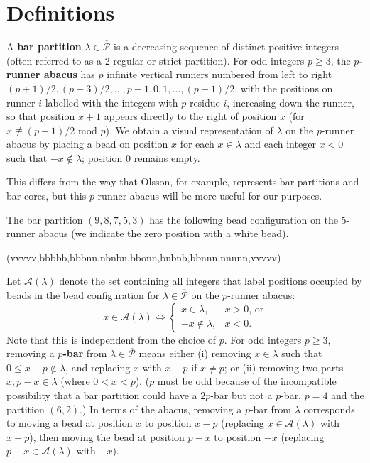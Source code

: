 \documentclass[ALCO, Unicode,published]{cedram}
\newcommand*\nicefrac[2]{#1/#2}
\begin{document}
\section{Definitions}
 
A \textbf{bar partition} $\lambda\in\overline{\mathcal{P}}$ is a decreasing sequence of distinct positive integers (often referred to as a 2-regular or strict partition). For odd integers $p\geq3$, the $p$\textbf{-runner abacus} \cite{F2} has $p$ infinite vertical runners numbered from left to right $\nicefrac{(p+1)}{2},\nicefrac{(p+3)}{2},\dots,p-1,0,1,\dots,\nicefrac{(p-1)}{2}$, with the positions on runner $i$ labelled with the integers with $p$ residue $i$, increasing down the runner, so that position $x+1$ appears directly to the right of position $x$ (for $x\not\equiv\nicefrac{(p-1)}{2}$ mod $p$). We obtain a visual representation of $\lambda$ on the $p$-runner abacus by placing a bead on position $x$ for each $x\in\lambda$ and each integer $x<0$ such that $-x\not\in\lambda$; position 0 remains empty. 

This differs from the way that Olsson, for example, represents bar partitions and bar-cores, but this $p$-runner abacus will be more useful for our purposes. 

\begin{exam}\label{ex1}
The bar partition $(9,8,7,5,3)$ has the following bead configuration on the 5-runner abacus (we indicate the zero position with a white bead).
\begin{center}\abacus(vvvvv,bbbbb,bbbnn,nbnbn,bbonn,bnbnb,bbnnn,nnnnn,vvvvv)\end{center}
\end{exam}

Let $\mathcal{A}(\lambda)$ denote the set containing all integers that label positions occupied by beads in the bead configuration for $\lambda\in\overline{\mathcal{P}}$ on the $p$-runner abacus: 
$$x\in\mathcal{A}(\lambda)\Leftrightarrow\begin{cases}x\in\lambda,&x>0\text{, or}\\-x\not\in\lambda,&x<0.\end{cases}$$
Note that this is independent from the choice of $p$. 
\newline
For odd integers $p\geq3$, removing a $p$\textbf{-bar} from $\lambda\in\overline{\mathcal{P}}$ means either \newline
(i) removing $x\in\lambda$ such that $0\leq x-p\not\in\lambda$, and replacing $x$ with $x-p$ if $x\neq p$; or \newline
(ii) removing two parts $x,p-x\in\lambda$ (where $0<x<p$).
\newline
 ($p$ must be odd because of the incompatible possibility that a bar partition could have a $2p$-bar but not a $p$-bar, \eg $p=4$ and the partition $(6,2)$.) \newline
In terms of the abacus, removing a $p$-bar from $\lambda$ corresponds to moving a bead at position $x$ to position $x-p$ (replacing $x\in\mathcal{A}(\lambda)$ with $x-p$), then moving the bead at position $p-x$ to position $-x$ (replacing $p-x\in\mathcal{A}(\lambda)$ with $-x$). 
\end{document}
